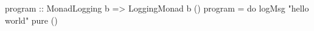 \begin{code}
program :: MonadLogging b => LoggingMonad b ()
program = do
  logMsg "hello world"
  pure ()
\end{code}
